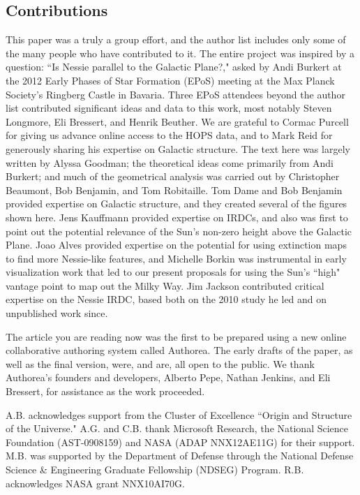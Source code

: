 \subsection{Contributions}

This paper was a truly a group effort, and the author list includes only
some of the many people who have contributed to it. The entire project
was inspired by a question: ``Is Nessie parallel to the Galactic Plane?,"
asked by Andi Burkert at the 2012 Early Phases of Star Formation
(EPoS) meeting at the Max Planck Society's Ringberg Castle in Bavaria. Three EPoS attendees beyond the author list contributed significant ideas and data to this
work, most notably Steven Longmore, Eli Bressert, and Henrik Beuther. We are grateful to
Cormac Purcell for giving us advance online access to the HOPS data, and
to Mark Reid for generously sharing his expertise on Galactic structure.
The text here was largely written by Alyssa Goodman; the theoretical
ideas come primarily from Andi Burkert; and much of the geometrical
analysis was carried out by Christopher Beaumont, Bob Benjamin, and Tom
Robitaille. Tom Dame and Bob Benjamin provided expertise on Galactic
structure, and they created several of the figures shown here. Jens Kauffmann provided expertise on IRDCs, and also was first to point out the potential relevance of the Sun's non-zero height above the Galactic Plane.  Joao Alves provided expertise on the potential for using extinction maps to find more Nessie-like features, and Michelle Borkin was instrumental in early visualization work that led to our present proposals for using the Sun's ``high" vantage point to map out the Milky Way.  Jim Jackson contributed critical expertise on the Nessie IRDC, based both on the 2010 study he led and on unpublished work since.

The article you are reading now was the first to be prepared using a new online collaborative authoring system called Authorea.  The early drafts of the paper, as well as the final version, were, and are, all open to the public. We thank Authorea's founders and developers, Alberto Pepe, Nathan Jenkins, and Eli Bressert, for assistance as the work proceeded. 

A.B. acknowledges support from the Cluster of Excellence ``Origin and Structure of the Universe." A.G. and C.B. thank Microsoft Research, the National Science Foundation (AST-0908159) and NASA (ADAP NNX12AE11G) for their support. M.B. was supported by the Department of Defense through the National Defense Science & Engineering Graduate Fellowship (NDSEG) Program. R.B. acknowledges NASA grant NNX10AI70G.


